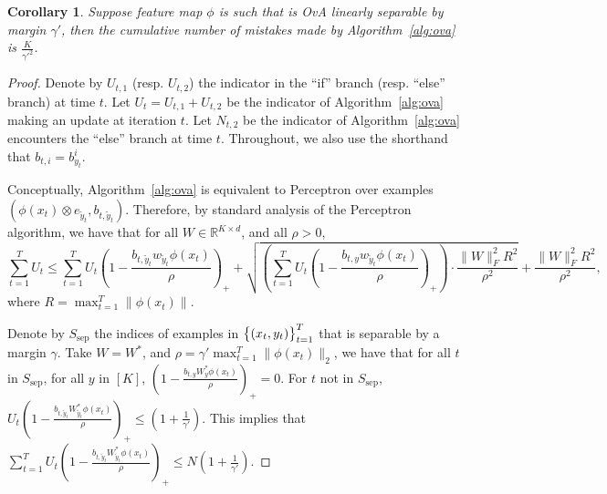 \documentclass{article}
\DeclareMathOperator*{\sep}{sep}
\newcommand{\field}[1]{\mathbb{#1}}
\newcommand{\fR}{\field{R}}
\newtheorem{corollary}[theorem]{Corollary}
\begin{document}
\begin{corollary}
Suppose feature map $\phi$ is such that  is OvA linearly separable by margin $\gamma'$, then the cumulative number of mistakes made by Algorithm~\ref{alg:ova} is $\frac{K}{\gamma'^2}$.
\end{corollary}

\begin{proof}
Denote by $U_{t,1}$ (resp. $U_{t,2}$) the indicator in the ``if'' branch (resp. ``else'' branch) at time $t$. Let $U_t = U_{t,1} + U_{t,2}$ be the indicator of Algorithm~\ref{alg:ova} making an update at iteration $t$.
Let $N_{t,2}$ be the indicator of Algorithm~\ref{alg:ova} encounters the ``else'' branch at time $t$. Throughout, we also use the shorthand that $b_{t,i} = b_{y_t}^i$.



%

Conceptually, Algorithm~\ref{alg:ova} is equivalent to Perceptron over examples $(\phi(x_t) \otimes e_{\tilde{y}_t}, b_{t, \tilde{y}_t})$.
Therefore, by standard analysis of the Perceptron algorithm, we have that for all $W \in \fR^{K \times d}$, and all $\rho > 0$,
\begin{equation}
\sum_{t=1}^T U_t
\leq
\sum_{t=1}^T  U_t (1 - \frac{b_{t,\tilde{y}_t} w_{\tilde{y}_t} \phi(x_t)}{\rho})_+
+ \sqrt{(\sum_{t=1}^T  U_t (1 - \frac{b_{t,y} w_{\tilde{y}_t} \phi(x_t)}{\rho})_+) \cdot \frac{\|W\|_F^2 R^2}{\rho^2} }
+ \frac{\|W\|_F^2 R^2}{\rho^2},
\label{eqn:perceptron-mb}
\end{equation}
where $R = \max_{t=1}^T \| \phi(x_t)\|$.

Denote by $S_{\sep}$ the indices of examples in $\cbr{(x_t, y_t)}_{t=1}^T$ that is separable by a margin $\gamma$.
Take $W = W^*$, and $\rho = \gamma' \max_{t=1}^T \| \phi(x_t) \|_2$, we have that for all $t$ in $S_{\sep}$, for all $y$ in $[K]$, $(1 - \frac{b_{t,y} W^*_y \phi(x_t)}{\rho})_+ = 0$. For $t$ not in $S_{\sep}$,
$U_t (1 - \frac{b_{t,\tilde{y}_t} W^*_{\tilde{y}_t} \phi(x_t)}{\rho})_+ \leq (1 + \frac{1}{\gamma'})$.
This implies that $\sum_{t=1}^T  U_t (1 - \frac{b_{t,\tilde{y}_t} W^*_{\tilde{y}_t} \phi(x_t)}{\rho})_+ \leq N(1 + \frac 1 {\gamma'})$.


\end{proof}
\end{document}

